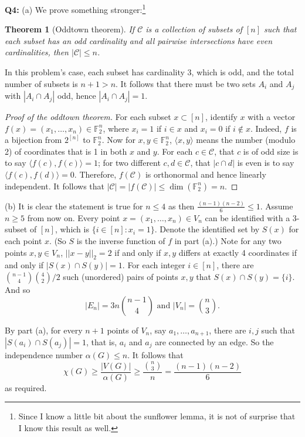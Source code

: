 \documentclass[12pt,reqno]{amsart}
\newtheorem{theorem}{Theorem}[section]
\theoremstyle{definition}
\newcommand{\ccc}{\mathcal{C}}
\newcommand{\cc}{\mathcal{C}}
\newcommand{\FF}{\mathbb{F}}
\newcommand{\inner}[1]{\langle #1 \rangle}
\begin{document}
\newpage
\noindent \textbf{Q4:} (a) We prove something stronger:\footnote{Since I know a little bit about the sunflower lemma, it is not of surprise that I know this result as well.}

\begin{theorem}[Oddtown theorem]
  If $\cc$ is a collection of subsets of $[n]$ such that each subset has an odd cardinality and all pairwise intersections have even cardinalities, then $|\cc|\leq n$.
\end{theorem}


In this problem's case, each subset has cardinality 3, which is odd, and the total number of subsets is $n+1>n$. It follows that there must be two sets $A_i$ and $A_j$ with $|A_i\cap A_j|$ odd, hence $|A_i\cap A_j|=1$.

\begin{proof}[Proof of the oddtown theorem]
  For each subset $x\subset [n]$, identify $x$ with a vector $f(x)=(x_1,\dots,x_n)\in \FF_2^n$, where $x_i=1$ if $i\in x$ and $x_i=0$ if $i\notin x$. Indeed, $f$ is a bijection from $2^{[n]}$ to $\FF_2^n$. Now for $x,y\in \FF_2^n$, $\inner{x,y}$ means the number (modulo 2) of coordinates that is 1 in both $x$ and $y$. For each $c\in \ccc$, that $c$ is of odd size is to say $\inner{f(c),f(c)}=1$; for two different $c,d\in \ccc$, that $|c\cap d|$ is even is to say $\inner{f(c),f(d)}=0$. Therefore, $f(\cc)$ is orthonormal and hence  linearly independent. It follows that $|\ccc|=|f(\ccc)|\leq \dim( \FF_2^n ) =n$.
\end{proof}



(b) It is clear the statement is true for $n\leq 4$ as then  $\frac{(n-1)(n-2)}{6}\leq 1$. Assume $n\geq 5$ from now on. Every point $x=(x_1,\dots,x_n)\in V_n$ can be identified with a 3-subset of $[n]$, which is $\{i\in [n]: x_i=1\}$. Denote the identified set by $S(x)$ for each point $x$. (So $S$ is the inverse function of $f$ in part (a).) Note for any two points $x,y\in V_n$, $||x-y||_2=2$ if and only if  $x,y$ differs at exactly 4 coordinates if and only if $|S(x)\cap S(y)|=1$. For each integer $i\in [n]$, there are $\binom{n-1}{4} \binom{4}{2}/2$ such (unordered) pairs of points $x,y$ that $S(x)\cap S(y)=\{i\}$. And so $$|E_n| = 3n\binom{n-1}{4}  \mbox{ and } |V_n|=\binom{n}{3}.$$

By part (a), for every $n+1$ points of $V_n$, say $a_1,\dots,a_{n+1}$, there are $i,j$ such that $|S(a_i)\cap S(a_j)|=1$, that is, $a_i$ and $ a_j$ are connected by an edge. So the independence number $\alpha(G) \leq n$. It follows that $$\chi(G) \geq \frac{|V(G)|}{\alpha(G)} \geq \frac{\binom{n}{3}}{n} = \frac{(n-1)(n-2)}{6}$$ as required.\\
\end{document}
